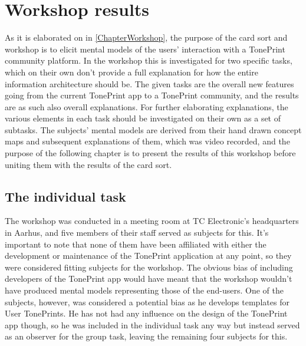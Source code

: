 \chapter{Workshop results}
\label{WorkshopResults}
As it is elaborated on in \autoref{ChapterWorkshop}, the purpose of the card sort and workshop is to elicit mental models of the users' interaction with a TonePrint community platform. In the workshop this is investigated for two specific tasks, which on their own don't provide a full explanation for how the entire information architecture should be. The given tasks are the overall new features going from the current TonePrint app to a TonePrint community, and the results are as such also overall explanations. For further elaborating explanations, the various elements in each task should be investigated on their own as a set of subtasks. The subjects' mental models are derived from their hand drawn concept maps and subsequent explanations of them, which was video recorded, and the purpose of the following chapter is to present the results of this workshop before uniting them with the results of the card sort.

\section{The individual task}
\label{IndividualTaskResults}
The workshop was conducted in a meeting room at TC Electronic's headquarters in Aarhus, and five members of their staff served as subjects for this. It's important to note that none of them have been affiliated with either the development or maintenance of the TonePrint application at any point, so they were considered fitting subjects for the workshop. The obvious bias of including developers of the TonePrint app would have meant that the workshop wouldn't have produced mental models representing those of the end-users. One of the subjects, however, was considered a potential bias as he develops templates for User TonePrints. He has not had any influence on the design of the TonePrint app though, so he was included in the individual task any way but instead served as an observer for the group task, leaving the remaining four subjects for this.

